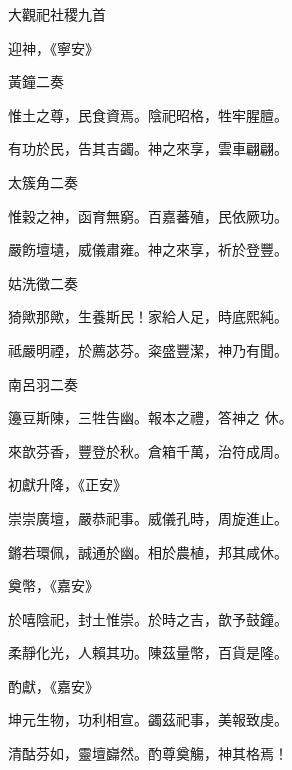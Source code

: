 \begin{pinyinscope}
 大觀祀社稷九首



 迎神，《寧安》



 黃鐘二奏



 惟土之尊，民食資焉。陰祀昭格，牲牢腥膻。



 有功於民，告其吉蠲。神之來享，雲車翩翩。



 太簇角二奏



 惟穀之神，函育無窮。百嘉蕃殖，民依厥功。



 嚴飭壇壝，威儀肅雍。神之來享，祈於登豐。



 姑洗徵二奏



 猗歟那歟，生養斯民！家給人足，時底熙純。



 祗嚴明禋，於薦苾芬。粢盛豐潔，神乃有聞。



 南呂羽二奏



 籩豆斯陳，三牲告幽。報本之禮，答神之
 休。



 來歆芬香，豐登於秋。倉箱千萬，治符成周。



 初獻升降，《正安》



 崇崇廣壇，嚴恭祀事。威儀孔時，周旋進止。



 鏘若環佩，誠通於幽。相於農植，邦其咸休。



 奠幣，《嘉安》



 於嘻陰祀，封土惟崇。於時之吉，歆予鼓鐘。



 柔靜化光，人賴其功。陳茲量幣，百貨是隆。



 酌獻，《嘉安》



 坤元生物，功利相宣。蠲茲祀事，美報致虔。



 清酤芬如，靈壇巋然。酌尊奠觴，神其格焉！




\end{pinyinscope}
